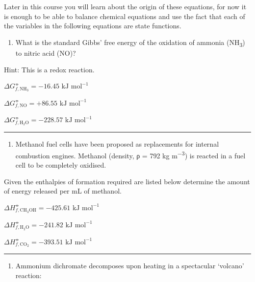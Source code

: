 \documentclass[
]{book}
\providecommand{\tightlist}{%
  \setlength{\itemsep}{0pt}\setlength{\parskip}{0pt}}
\begin{document}
Later in this course you will learn about the origin of these equations, for now it is enough to be able to balance chemical equations and use the fact that each of the variables in the following equations are state functions.

\begin{enumerate}
\def\labelenumi{\arabic{enumi}.}
\tightlist
\item
  What is the standard Gibbs' free energy of the oxidation of ammonia (NH\textsubscript{3}) to nitric acid (NO)?
\end{enumerate}

Hint: This is a redox reaction.

\(ΔG^⦵_{f, \textrm{NH}_3} = −16.45 \textrm{ kJ mol}^{−1}\)

\(ΔG^⦵_{f, \textrm{NO}} = +86.55 \textrm{ kJ mol}^{−1}\)

\(ΔG^⦵_{f, \textrm{H}_2 \textrm{O}} = −228.57 \textrm{ kJ mol}^{−1}\)

\begin{center}\rule{0.5\linewidth}{0.5pt}\end{center}

\begin{enumerate}
\def\labelenumi{\arabic{enumi}.}
\setcounter{enumi}{1}
\tightlist
\item
  Methanol fuel cells have been proposed as replacements for internal combustion engines. Methanol (density, ρ = 792 kg m\textsuperscript{−3}) is reacted in a fuel cell to be completely oxidised.
\end{enumerate}

Given the enthalpies of formation required are listed below determine the amount of energy released per mL of methanol.

\(ΔH^⦵_{f, \textrm{CH}_3\textrm{OH}} = −425.61 \textrm{ kJ mol}^{−1}\)

\(ΔH^⦵_{f, \textrm{H}_2 \textrm{O}} = −241.82 \textrm{ kJ mol}^{−1}\)

\(ΔH^⦵_{f, \textrm{CO}_2} = −393.51 \textrm{ kJ mol}^{−1}\)

\begin{center}\rule{0.5\linewidth}{0.5pt}\end{center}

\begin{enumerate}
\def\labelenumi{\arabic{enumi}.}
\setcounter{enumi}{2}
\tightlist
\item
  Ammonium dichromate decomposes upon heating in a spectacular `volcano' reaction:
\end{enumerate}
\end{document}
